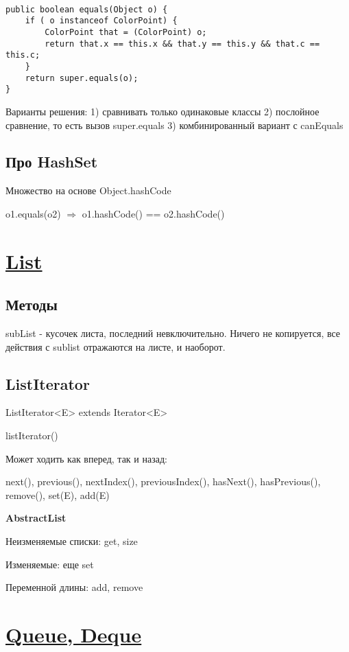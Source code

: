 \documentclass{article}
\begin{document}
\begin{lstlisting}

public boolean equals(Object o) {
	if ( o instanceof ColorPoint) {
		ColorPoint that = (ColorPoint) o;
		return that.x == this.x && that.y == this.y && that.c == this.c;
	}
	return super.equals(o);
}

\end{lstlisting}

Варианты решения: 1) сравнивать только одинаковые классы 2) послойное сравнение, то есть вызов super.equals 3) комбинированный вариант с canEquals

\subsection{Про HashSet}

Множество на основе Object.hashCode

o1.equals(o2) $\Rightarrow$ o1.hashCode() == o2.hashCode() 

\section{\underline{List}}

\subsection{Методы}

subList - кусочек листа, последний невключительно. Ничего не копируется, все действия с sublist отражаются на листе, и наоборот.

\subsection{ListIterator}

ListIterator<E> extends Iterator<E>

listIterator()

Может ходить как вперед, так и назад:

next(), previous(), nextIndex(), previousIndex(), hasNext(), hasPrevious(), remove(), set(E), add(E)

\textbf{AbstractList}

Неизменяемые списки: get, size

Изменяемые: еще set

Переменной длины: add, remove

\section{\underline{Queue, Deque}}
\end{document}
